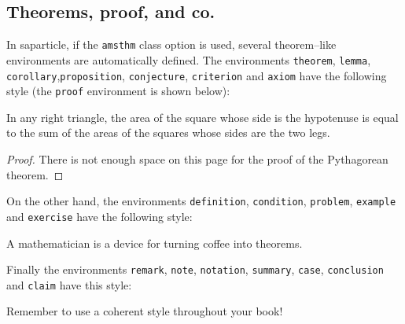 \documentclass[amsthm,ebook]{saparticle}
\begin{document}
\subsection{Theorems, proof, and co.}

In \textsf{saparticle}, if the \texttt{amsthm} class option is used, several theorem--like environments are automatically defined. The environments \texttt{theorem}, \texttt{lemma}, \texttt{corollary},\texttt{proposition}, \texttt{conjecture}, \texttt{criterion} and \texttt{axiom} have the following style (the \texttt{proof} environment is shown below):
\begin{theorem}
In any right triangle, the area of the square whose side is the hypotenuse is equal to the sum of the areas of the squares whose sides are the two legs.
\end{theorem}
\begin{proof}
There is not enough space on this page for the proof of the Pythago\-rean theorem.
\end{proof}

\noindent
On the other hand, the environments \texttt{definition}, \texttt{condition}, \texttt{problem}, \texttt{example} and \texttt{exercise} have the following style:
\begin{definition}
A mathematician is a device for turning coffee into theorems.
\end{definition}

\noindent
Finally the environments \texttt{remark}, \texttt{note}, \texttt{notation}, \texttt{summary}, \texttt{case}, \texttt{con\-clusion} and \texttt{claim} have
this style:
\begin{remark}
Remember to use a coherent style throughout your book!
\end{remark}



\end{document}
